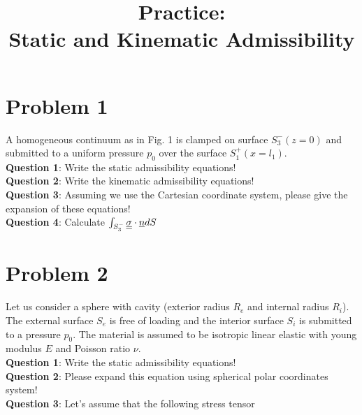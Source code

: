 \documentclass[letter,12pt]{article}
\begin{document}
\pagestyle{fancy}

\title{\textbf{Practice: \\ Static and Kinematic Admissibility}}
\date{}

\maketitle

\vspace{-1cm}


\section{Problem 1 }
A homogeneous continuum as in Fig. 1 is clamped on surface $S_3^-(z = 0)$  and submitted to a uniform pressure $p_0$ over the surface $S_1^+(x=l_1)$. \\

\noindent \textbf{Question 1}: Write the static admissibility equations! \\

\noindent \textbf{Question 2}: Write the kinematic admissibility equations! \\

\noindent \textbf{Question 3}: Assuming we use the Cartesian coordinate system, please give the expansion of these equations! \\

\noindent \textbf{Question 4}: Calculate $\int_{S_3^-} \underline{\underline{\sigma}} \cdot \underline{n} dS$ \\

\section{Problem 2}
Let us consider a sphere with cavity (exterior radius $R_e$ and internal radius $R_i$). The external surface $S_e$ is free of loading and the interior surface $S_i$ is submitted to a pressure $p_0$. The material is assumed to be isotropic linear elastic with young modulus $E$ and Poisson ratio $\nu$. \\

\noindent \textbf{Question 1}: Write the static admissibility equations! \\

\noindent \textbf{Question 2}: Please expand this equation using spherical polar coordinates system! \\

\noindent \textbf{Question 3}: Let's assume that the following stress tensor 
\end{document}
